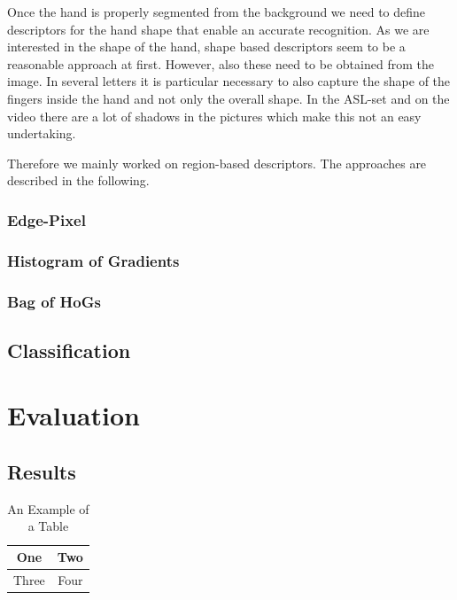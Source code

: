 \documentclass[letterpaper, 10 pt, conference]{ieeeconf}  %
\begin{document}
Once the hand is properly segmented from the background we need to define descriptors for the hand shape that enable an accurate recognition. As we are interested in the shape of the hand, shape based descriptors seem to be a reasonable approach at first. However, also these need to be obtained from the image. In several letters it is particular necessary to also capture the shape of the fingers inside the hand and not only the overall shape. In the ASL-set and on the video there are a lot of shadows in the pictures which make this not an easy undertaking.

Therefore we mainly worked on region-based descriptors. The approaches are described in the following.

\subsubsection{Edge-Pixel}

\subsubsection{Histogram of Gradients}

\subsubsection{Bag of HoGs}

\subsection{Classification}


\section{Evaluation}
\label{sec:eval}

\subsection{Results}


\begin{table}[h]
\caption{An Example of a Table}
\label{table_example}
\begin{center}
\begin{tabular}{|c||c|}
\hline
One & Two\\
\hline
Three & Four\\
\hline
\end{tabular}
\end{center}
\end{table}
\end{document}
